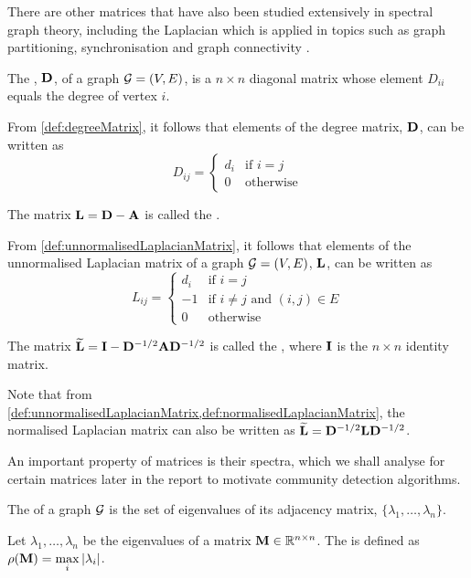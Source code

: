 There are other matrices that have also been studied extensively in spectral graph theory, including the Laplacian which is applied in topics such as graph partitioning, synchronisation and graph connectivity \cite{For10}.
\begin{definition}
	\label{def:degreeMatrix}
	The , $\mathbf D$, of a graph $\mathcal G = (V,E)$, is a $n \times n$ diagonal matrix whose element $D_{ii}$ equals the degree of vertex $i$.
\end{definition}
From \cref{def:degreeMatrix}, it follows that elements of the degree matrix, $\mathbf D$, can be written as
\begin{equation}
	 D_{ij} =
	\begin{cases}
		d_{i} & \text{if } i = j\\
		0 & \text{otherwise}
	\end{cases}
\end{equation}
\begin{definition}
	\label{def:unnormalisedLaplacianMatrix}
	The matrix $\mathbf L = \mathbf D  - \mathbf A $ is called the .
\end{definition}
From \cref{def:unnormalisedLaplacianMatrix}, it follows that elements of the unnormalised Laplacian matrix of a graph $\mathcal G = (V,E)$, $\mathbf L$, can be written as
\begin{equation}
	L_{ij} =
	\begin{cases}
		d_{i} & \text{if } i = j\\
		-1 & \text{if } i \neq j \text{ and }  (i,j) \in E\\
		0 & \text{otherwise}
	\end{cases}
\end{equation}
\begin{definition}
	\label{def:normalisedLaplacianMatrix}
	The matrix $\widetilde{\mathbf L} = \mathbf I  - \mathbf D^{-1/2}\mathbf A\mathbf D^{-1/2}$ is called the , where $\mathbf I$ is the $n \times n$ identity matrix.
\end{definition}
Note that from \cref{def:unnormalisedLaplacianMatrix,def:normalisedLaplacianMatrix}, the normalised Laplacian matrix can also be written as $\widetilde{\mathbf L} = \mathbf D^{-1/2}\mathbf L\mathbf D^{-1/2}$.

An important property of matrices is their spectra, which we shall analyse for certain matrices later in the report to motivate community detection algorithms.
\begin{definition}
	\label{def:spectrum}
	The  of a graph $\mathcal G$ is the set of eigenvalues of its adjacency matrix, $\{\lambda_{1},\dots,\lambda_{n}\}$.
\end{definition}
\begin{definition}
	\label{def:spectralRadius}
	Let $\lambda_{1},\dots,\lambda_{n}$ be the eigenvalues of a matrix $\mathbf M \in \mathbb{R}^{n \times n}$. The  is defined as $\rho(\mathbf M) = \max\limits_{i} \left\vert\lambda_{i}\right\vert$.
\end{definition}


